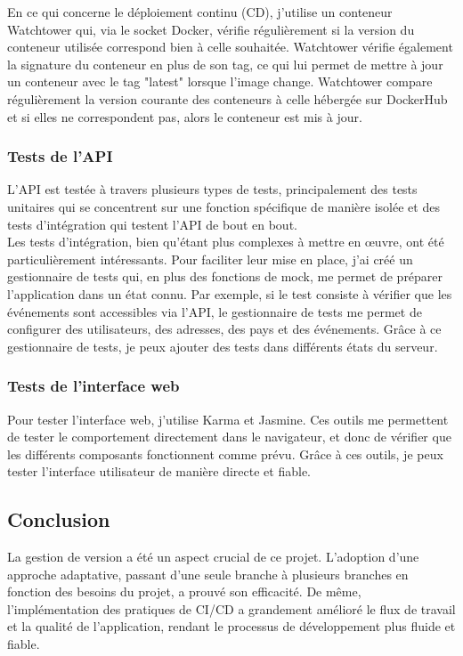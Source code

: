 En ce qui concerne le déploiement continu (CD), j'utilise un conteneur Watchtower qui, via le socket Docker, vérifie régulièrement si la version du conteneur utilisée correspond bien à celle souhaitée.
Watchtower vérifie également la signature du conteneur en plus de son tag, ce qui lui permet de mettre à jour un conteneur avec le tag "latest" lorsque l'image change.
Watchtower compare régulièrement la version courante des conteneurs à celle hébergée sur DockerHub et si elles ne correspondent pas, alors le conteneur est mis à jour.

\subsubsection{Tests de l'API}
L'API est testée à travers plusieurs types de tests, principalement des tests unitaires qui se concentrent sur une fonction
spécifique de manière isolée et des tests d'intégration qui testent l'API de bout en bout.\\

Les tests d'intégration, bien qu'étant plus complexes à mettre en œuvre, ont été particulièrement intéressants.
Pour faciliter leur mise en place, j'ai créé un gestionnaire de tests qui, en plus des fonctions de mock, me permet de préparer l'application dans un état connu.
Par exemple, si le test consiste à vérifier que les événements sont accessibles via l'API, le gestionnaire de tests me permet de configurer des utilisateurs, des adresses, des pays et des événements.
Grâce à ce gestionnaire de tests, je peux ajouter des tests dans différents états du serveur.

\subsubsection{Tests de l'interface web}
Pour tester l'interface web, j'utilise Karma et Jasmine.
Ces outils me permettent de tester le comportement directement dans le navigateur, et donc de vérifier que les différents composants fonctionnent comme prévu.
Grâce à ces outils, je peux tester l'interface utilisateur de manière directe et fiable.

\subsection{Conclusion}\label{subsec:conclusion}

La gestion de version a été un aspect crucial de ce projet.
L'adoption d'une approche adaptative, passant d'une seule branche à plusieurs branches en fonction des besoins du projet, a prouvé son efficacité.
De même, l'implémentation des pratiques de CI/CD a grandement amélioré le flux de travail et la qualité de l'application, rendant le processus de développement plus fluide et fiable.